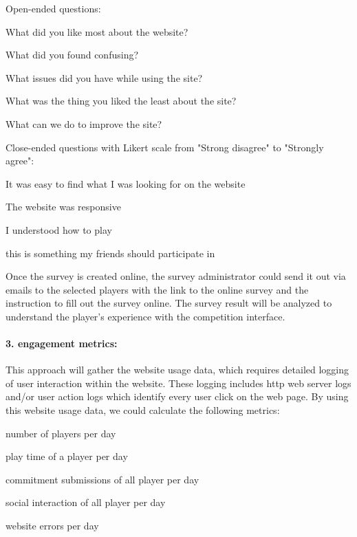 Open-ended questions: 
\begin{compactitem}
\item What did you like most about the website?
\item What did you found confusing?
\item What issues did you have while using the site?
\item What was the thing you liked the least about the site?
\item What can we do to improve the site?\\
\end{compactitem}

Close-ended questions with Likert scale from "Strong disagree" to "Strongly agree": 
\begin{compactitem}
\item It was easy to find what I was looking for on the website
\item The website was responsive 
\item I understood how to play
\item this is something my friends should participate in
\end{compactitem}

Once the survey is created online, the survey administrator could send it out via emails to the selected players with the link to the online survey and the instruction to fill out the survey online.
The survey result will be analyzed to understand the player's experience with the competition interface.
 
\paragraph{3. engagement metrics: }

This approach will gather the website usage data, which requires detailed logging of user interaction within the website. These logging includes http web server logs and/or user action logs which identify every user click on the web page. By using this website usage data, we could calculate the following metrics:

\begin{compactitem}
\item  number of players per day
\item  play time of a player per day
\item  commitment submissions of all player per day
\item  social interaction of all player per day
\item  website errors per day
\end{compactitem}

